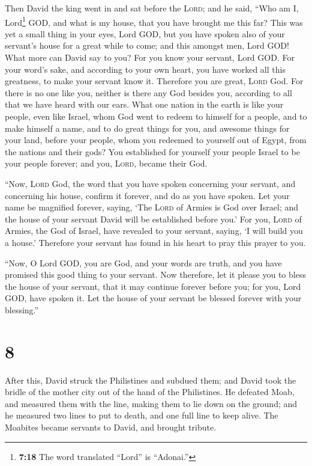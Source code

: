  Then David the king went in and sat before the
\textsc{Lord}; and he said, ``Who am I, Lord\footnote{\textbf{7:18} The
  word translated ``Lord'' is ``Adonai.''} GOD, and what is my house,
that you have brought me this far?  This was yet a small
thing in your eyes, Lord GOD, but you have spoken also of your servant's
house for a great while to come; and this amongst men, Lord GOD!
 What more can David say to you? For you know your
servant, Lord GOD.  For your word's sake, and according
to your own heart, you have worked all this greatness, to make your
servant know it.  Therefore you are great, \textsc{Lord}
God. For there is no one like you, neither is there any God besides you,
according to all that we have heard with our ears.  What
one nation in the earth is like your people, even like Israel, whom God
went to redeem to himself for a people, and to make himself a name, and
to do great things for you, and awesome things for your land, before
your people, whom you redeemed to yourself out of Egypt, from the
nations and their gods?  You established for yourself
your people Israel to be your people forever; and you, \textsc{Lord},
became their God.

 ``Now, \textsc{Lord} God, the word that you have spoken
concerning your servant, and concerning his house, confirm it forever,
and do as you have spoken.  Let your name be magnified
forever, saying, `The \textsc{Lord} of Armies is God over Israel; and
the house of your servant David will be established before you.'
 For you, \textsc{Lord} of Armies, the God of Israel,
have revealed to your servant, saying, `I will build you a house.'
Therefore your servant has found in his heart to pray this prayer to
you.

 ``Now, O Lord GOD, you are God, and your words are
truth, and you have promised this good thing to your servant.
 Now therefore, let it please you to bless the house of
your servant, that it may continue forever before you; for you, Lord
GOD, have spoken it. Let the house of your servant be blessed forever
with your blessing.''

\hypertarget{section-7}{%
\section{8}\label{section-7}}

 After this, David struck the Philistines and subdued
them; and David took the bridle of the mother city out of the hand of
the Philistines.  He defeated Moab, and measured them with
the line, making them to lie down on the ground; and he measured two
lines to put to death, and one full line to keep alive. The Moabites
became servants to David, and brought tribute.

